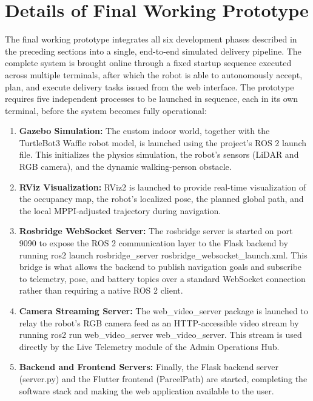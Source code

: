 \section{Details of Final Working Prototype}
\label{sec:final_prototype}

The final working prototype integrates all six development phases described in
the preceding sections into a single, end-to-end simulated delivery pipeline. The
complete system is brought online through a fixed startup sequence executed across
multiple terminals, after which the robot is able to autonomously accept, plan, and
execute delivery tasks issued from the web interface.
The prototype requires five independent processes to be launched in sequence, each
in its own terminal, before the system becomes fully operational:
\begin{enumerate}
	\item \textbf{Gazebo Simulation:} The custom indoor world,
	together with the TurtleBot3 Waffle robot model, is launched using the
	project's ROS 2 launch file. This initializes the physics simulation,
	the robot's sensors (LiDAR and RGB camera), and the dynamic walking-person
	obstacle.
	
	\item \textbf{RViz Visualization:} RViz2 is launched to provide real-time
	visualization of the occupancy map, the robot's localized pose, the planned
	global path, and the local MPPI-adjusted trajectory during navigation.
	
	\item \textbf{Rosbridge WebSocket Server:} The rosbridge server is started
	on port 9090 to expose the ROS 2 communication layer to the Flask backend
	by running ros2 launch rosbridge\_server rosbridge\_websocket\_launch.xml.
	This bridge is what allows the backend to publish navigation goals and
	subscribe to telemetry, pose, and battery topics over a standard WebSocket
	connection rather than requiring a native ROS 2 client.
	
	\item \textbf{Camera Streaming Server:} The web\_video\_server
	package is launched to relay the robot's RGB camera feed as an
	HTTP-accessible video stream by running ros2 run web\_video\_server
	web\_video\_server. This stream is used directly by the Live Telemetry module of the Admin Operations Hub.
	
	\item \textbf{Backend and Frontend Servers:} Finally, the Flask backend server (server.py) and the Flutter frontend (ParcelPath) are started, completing the software stack and making the web application available to the user.
\end{enumerate}
